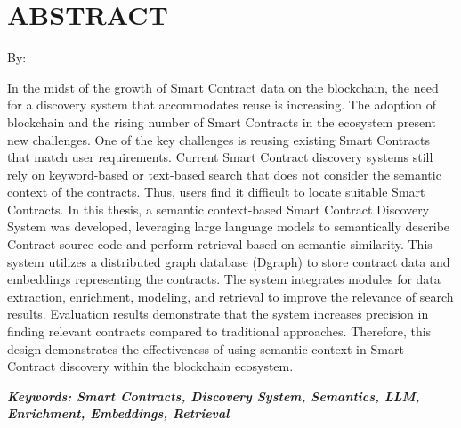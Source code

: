 \clearpage
\chapter*{ABSTRACT}

\begin{center}
	\center
	\begin{singlespace}
		\large\bfseries\MakeUppercase{\thetitle}

		\normalfont\normalsize
		By:

		\bfseries \theauthor
	\end{singlespace}
\end{center}

\begin{singlespace}
	\small

    In the midst of the growth of Smart Contract data on the blockchain, the need for a discovery system that accommodates reuse is increasing. The adoption of blockchain and the rising number of Smart Contracts in the ecosystem present new challenges. One of the key challenges is reusing existing Smart Contracts that match user requirements. Current Smart Contract discovery systems still rely on keyword-based or text-based search that does not consider the semantic context of the contracts. Thus, users find it difficult to locate suitable Smart Contracts. In this thesis, a semantic context-based Smart Contract Discovery System was developed, leveraging large language models to semantically describe Contract source code and perform retrieval based on semantic similarity. This system utilizes a distributed graph database (Dgraph) to store contract data and embeddings representing the contracts. The system integrates modules for data extraction, enrichment, modeling, and retrieval to improve the relevance of search results. Evaluation results demonstrate that the system increases precision in finding relevant contracts compared to traditional approaches. Therefore, this design demonstrates the effectiveness of using semantic context in Smart Contract discovery within the blockchain ecosystem.

	\textbf{\textit{Keywords: Smart Contracts, Discovery System, Semantics, LLM, Enrichment, Embeddings, Retrieval}}
\end{singlespace}
\clearpage

\clearpage